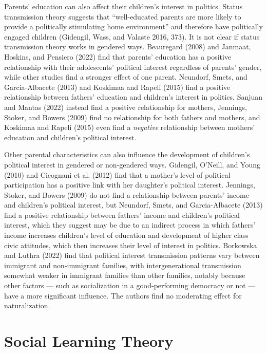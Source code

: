 \documentclass[
  letterpaper,
  DIV=11,
  numbers=noendperiod]{scrreprt}
\begin{document}
Parents' education can also affect their children's interest in
politics. Status transmission theory suggests that ``well-educated
parents are more likely to provide a politically stimulating home
environment'' and therefore have politically engaged children (Gidengil,
Wass, and Valaste 2016, 373). It is not clear if status transmission
theory works in gendered ways. Beauregard (2008) and Janmaat, Hoskins,
and Pensiero (2022) find that parents' education has a positive
relationship with their adolescents' political interest regardless of
parents' gender, while other studies find a stronger effect of one
parent. Neundorf, Smets, and Garcia-Albacete (2013) and Koskimaa and
Rapeli (2015) find a positive relationship between fathers' education
and children's interest in politics, Sanjuan and Mantas (2022) instead
find a positive relationship for mothers, Jennings, Stoker, and Bowers
(2009) find no relationship for both fathers and mothers, and Koskimaa
and Rapeli (2015) even find a \emph{negative} relationship between
mothers' education and children's political interest.

Other parental characteristics can also influence the development of
children's political interest in gendered or non-gendered ways.
Gidengil, O'Neill, and Young (2010) and Cicognani et al. (2012) find
that a mother's level of political participation has a positive link
with her daughter's political interest. Jennings, Stoker, and Bowers
(2009) do not find a relationship between parents' income and children's
political interest, but Neundorf, Smets, and Garcia-Albacete (2013) find
a positive relationship between fathers' income and children's political
interest, which they suggest may be due to an indirect process in which
fathers' income increases children's level of education and development
of higher class civic attitudes, which then increases their level of
interest in politics. Borkowska and Luthra (2022) find that political
interest transmission patterns vary between immigrant and non-immigrant
families, with intergenerational transmission somewhat weaker in
immigrant families than other families, notably because other factors
--- such as socialization in a good-performing democracy or not --- have
a more significant influence. The authors find no moderating effect for
naturalization.

\hypertarget{social-learning-theory-1}{%
\section{Social Learning Theory}\label{social-learning-theory-1}}
\end{document}
